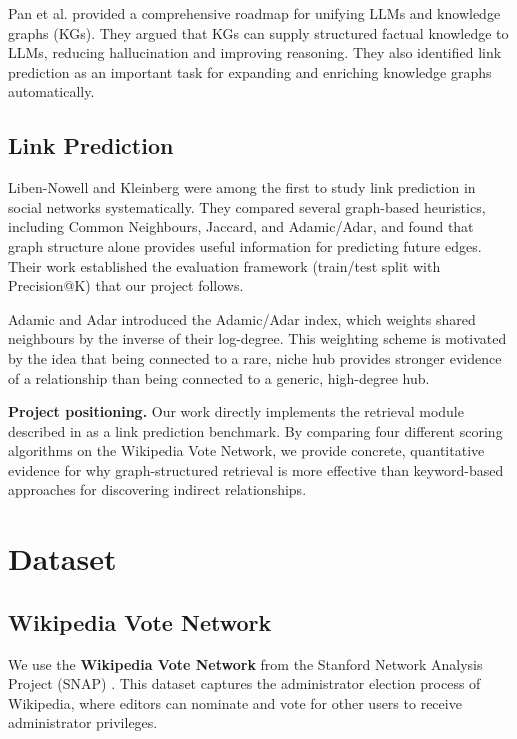 \documentclass[10pt]{article}
\begin{document}
Pan et al. \cite{pan2024} provided a comprehensive roadmap for unifying LLMs and knowledge graphs (KGs). They argued that KGs can supply structured factual knowledge to LLMs, reducing hallucination and improving reasoning. They also identified link prediction as an important task for expanding and enriching knowledge graphs automatically.

\subsection{Link Prediction}

Liben-Nowell and Kleinberg \cite{libennowell2003} were among the first to study link prediction in social networks systematically. They compared several graph-based heuristics, including Common Neighbours, Jaccard, and Adamic/Adar, and found that graph structure alone provides useful information for predicting future edges. Their work established the evaluation framework (train/test split with Precision@K) that our project follows.

Adamic and Adar \cite{adamic2003} introduced the Adamic/Adar index, which weights shared neighbours by the inverse of their log-degree. This weighting scheme is motivated by the idea that being connected to a rare, niche hub provides stronger evidence of a relationship than being connected to a generic, high-degree hub.

\begin{callout}
\textbf{Project positioning.} Our work directly implements the retrieval module described in \cite{edge2024} as a link prediction benchmark. By comparing four different scoring algorithms on the Wikipedia Vote Network, we provide concrete, quantitative evidence for why graph-structured retrieval is more effective than keyword-based approaches for discovering indirect relationships.
\end{callout}

\section{Dataset}
\label{sec:dataset}

\subsection{Wikipedia Vote Network}

We use the \textbf{Wikipedia Vote Network} from the Stanford Network Analysis Project (SNAP) \cite{snap2014}. This dataset captures the administrator election process of Wikipedia, where editors can nominate and vote for other users to receive administrator privileges.
\end{document}
